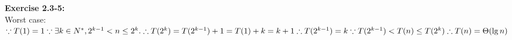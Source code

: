 \documentclass{article}
\begin{document}
\begin{spacing}{2.0}
\noindent
\textbf{Exercise 2.3-5:}\\
Worst case:\\
$
\because T(1) = 1\\
\because \exists k \in N^*, 2^{k - 1} < n \le 2^k.\\
\therefore T(2^k) = T(2^{k - 1}) + 1 = T(1) + k = k + 1\\
\therefore T(2^{k - 1}) = k\\
\because T(2^{k - 1}) < T(n) \le T(2^k)\\
\therefore T(n) = \Theta(\lg n)
$
\end{spacing}
\end{document}
